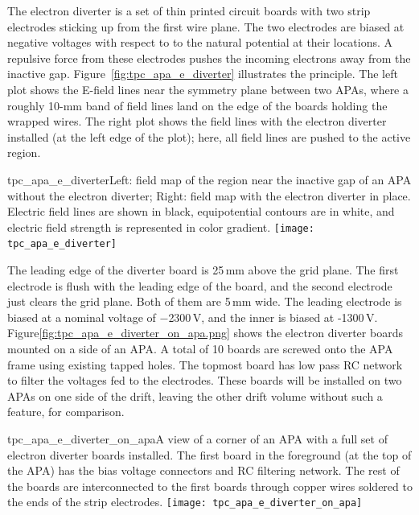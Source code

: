 The electron diverter is a set of thin printed circuit boards with two strip electrodes sticking up from the first wire plane.  The two electrodes are biased at %
negative voltages with respect to to the natural potential at their locations.  A repulsive force from these electrodes pushes the incoming electrons away %
from the inactive gap.  Figure~\ref{fig:tpc_apa_e_diverter} illustrates the principle. The left plot shows the E-field lines near the symmetry plane between two APAs, where a roughly 10-mm band of field lines land on the edge of the boards holding the wrapped wires.  The right plot shows the field lines with the electron diverter installed (at the left edge of the plot); here, all field lines are pushed to the active region.

\begin{cdrfigure}{tpc_apa_e_diverter}{Left: field map of the region near the inactive gap of an APA without the electron diverter; Right: field map with the electron diverter in place.
Electric field lines are shown in black, equipotential contours are in white, and electric field strength is represented in color gradient.}
\texttt{[image: tpc\_apa\_e\_diverter]} 
\end{cdrfigure}

 
The leading edge of the diverter board is 25\,mm above the grid plane.  The first electrode is flush with the leading edge of the board, and the second electrode just clears the grid plane.  Both of them are 5\,mm wide.  The leading electrode is biased at a nominal voltage of $-$2300\,V, and the inner is biased at -1300\,V.     Figure\ref{fig:tpc_apa_e_diverter_on_apa.png} shows the electron diverter boards mounted on a side of an APA.  A total of 10 boards are screwed onto the APA frame using existing tapped holes.  The topmost board has low pass RC network to filter the voltages fed to the electrodes.  These boards will be installed on two APAs on one side of the drift, leaving the other drift volume without such a feature, for comparison.
 
 \begin{cdrfigure}{tpc_apa_e_diverter_on_apa}{A view of a corner of an APA with a full set of electron diverter boards installed.  The first board in the foreground (at the top of the APA) has the bias voltage connectors and RC filtering network.  The rest of the boards are interconnected to the first boards through copper wires soldered to the ends of the strip electrodes.}
\texttt{[image: tpc\_apa\_e\_diverter\_on\_apa]} 
\end{cdrfigure}


